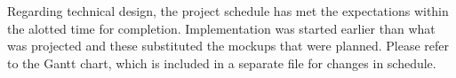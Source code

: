 

Regarding technical design, the project schedule has met the expectations within the alotted time for completion. Implementation was started earlier than what was projected and these substituted the mockups that were planned. Please refer to the Gantt chart, which is included in a separate file for changes in schedule. 

